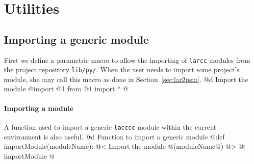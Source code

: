 \documentclass[11pt,oneside]{article}	%
\begin{document}


\appendix
\section{Utilities}

\subsection{Importing a generic module}
First we define a parametric macro to allow the importing of \texttt{larcc} modules from the project repository \texttt{lib/py/}. When the user needs to import some project's module, she may call this macro as done in Section~\ref{sec:lar2psm}.
@d Import the module
@{import @1
from @1 import *
@}

\paragraph{Importing a module} A function used to import a generic \texttt{lacccc} module within the current environment is also useful.
@d Function to import a generic module
@{def importModule(moduleName):
	@< Import the module @(moduleName@) @>
@| importModule @}




\end{document}
